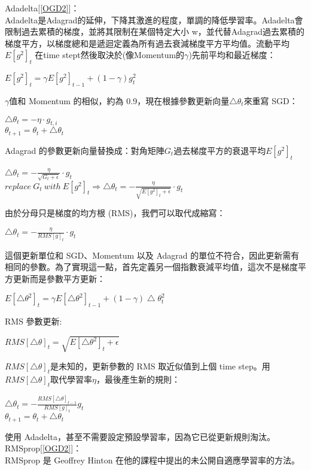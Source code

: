 \begin{itemize}
Adadelta[\ref{OGD2}]：\\
 Adadelta是Adagrad的延伸，下降其激進的程度，單調的降低學習率。Adadelta會限制過去累積的梯度，並將其限制在某個特定大小 w，並代替Adagrad過去累積的梯度平方，以梯度總和是遞迴定義為所有過去衰減梯度平方平均值。流動平均$E[g^2]_t$ 在time stept然後取決於(像Momentum的$\gamma$)先前平均和最近梯度：
\begin{center}
$E[g^2]_t=\gamma E[g^2]_{t-1}+(1-\gamma)g^2 _t$
\end{center}
$\gamma$值和 Momentum 的相似，約為 0.9，現在根據參數更新向量$\bigtriangleup\theta_t$來重寫 SGD：
\begin{center}
$\bigtriangleup\theta_t=-\eta\cdot g_{t,i}$\\
$\theta_{t+1}=\theta_t+\bigtriangleup\theta_t$
\end{center}
Adagrad 的參數更新向量替換成：對角矩陣$G_t$過去梯度平方的衰退平均$E[g^2]_t$
\begin{center}
$\bigtriangleup\theta_t=-\frac{\eta}{\sqrt{G_t+\epsilon}}\cdot g_t$\\
$replace\ G_t\ with\ E[g^2]_t\Rightarrow\bigtriangleup\theta_t=-\frac{\eta}{\sqrt{E[g^2]_t+\epsilon}}\cdot g_t$
\end{center}
由於分母只是梯度的均方根 (RMS)，我們可以取代成縮寫：
\begin{center}
$\bigtriangleup\theta_t=-\frac{\eta}{RMS[g]_t}\cdot g_t$
\end{center}
 這個更新單位和 SGD、Momentum 以及 Adagrad 的單位不符合，因此更新需有相同的參數。為了實現這一點，首先定義另一個指數衰減平均值，這次不是梯度平方更新而是參數平方更新：
\begin{center}
$E[\bigtriangleup\theta^2]_t=\gamma E[\bigtriangleup\theta^2]_{t-1}+(1-\gamma)\bigtriangleup\theta^2 _t$
\end{center}
RMS 參數更新:
\begin{center}
$RMS[\bigtriangleup\theta]_t=\sqrt{E[\bigtriangleup\theta^2]_t+\epsilon}$
\end{center}
$RMS[\bigtriangleup\theta]_t$是未知的，更新參數的 RMS 取近似值到上個 time step。用$RMS[\bigtriangleup\theta]_t$取代學習率$\eta$，最後產生新的規則：
\begin{center}
$\bigtriangleup\theta_t=-\frac{RMS[\bigtriangleup\theta]_{t-1}}{RMS[g]_t}g_t$
\\
$\theta_{t+1}=\theta_t+\bigtriangleup\theta_t$
\end{center}
使用 Adadelta，甚至不需要設定預設學習率，因為它已從更新規則淘汰。\\
RMSprop[\ref{OGD2}]：\\
 RMSprop 是 Geoffrey Hinton 在他的課程中提出的未公開自適應學習率的方法。\\


\end{itemize}
